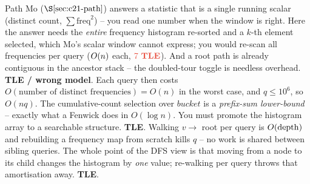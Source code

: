 \begin{thinkbox}
{Path Mo (\(\secref{c21-path}\)) answers a statistic that is a single running scalar
(distinct count, \(\sum\mathrm{freq}^2\)) -- you read one number when the window is right.
Here the answer needs the \emph{entire} frequency histogram re-sorted and a \(k\)-th
element selected, which Mo's scalar window cannot express; you would re-scan all
frequencies per query (\(O(n)\) each, \(\tle\)). And a root path is already
contiguous in the ancestor stack -- the doubled-tour toggle is needless overhead.
\textbf{TLE / wrong model}.}
{Each query then costs \(O(\text{number of distinct frequencies})=O(n)\) in the worst
case, and \(q\le 10^6\), so \(O(nq)\). The cumulative-count selection over
\(\mathit{bucket}\) is a \emph{prefix-sum lower-bound} -- exactly what a Fenwick does in
\(O(\log n)\). You must promote the histogram array to a searchable structure.
\textbf{TLE}.}
{Walking \(v\to\) root per query is \(O(\operatorname{depth})\) and rebuilding a frequency map from
scratch kills \(q\) -- no work is shared between sibling queries. The whole point of the
DFS view is that moving from a node to its child changes the histogram by \emph{one}
value; re-walking per query throws that amortisation away. \textbf{TLE}.}
\end{thinkbox}

